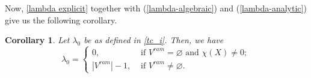 \documentclass[11pt]{amsart}
\newtheorem{corollary}[theorem]{Corollary}
\numberwithin{equation}{section}
\theoremstyle{remark}
\theoremstyle{definition}
\begin{document}
Now, \cref{lambda explicit} together with (\ref{lambda-algebraic}) and (\ref{lambda-analytic}) give us the following corollary.
\begin{corollary}
Let $\lambda_0$ be as defined in \cref{tc_i}. Then, we have
\begin{equation*}
\lambda_0 = 
\begin{cases}
0, &\text{ if } V^{ram}=\varnothing \text{ and } \chi(X)\neq 0; \\
|V^{ram}|-1, &\text{ if } V^{ram} \neq \varnothing.
\end{cases}
\end{equation*}
\end{corollary}


\end{document}
